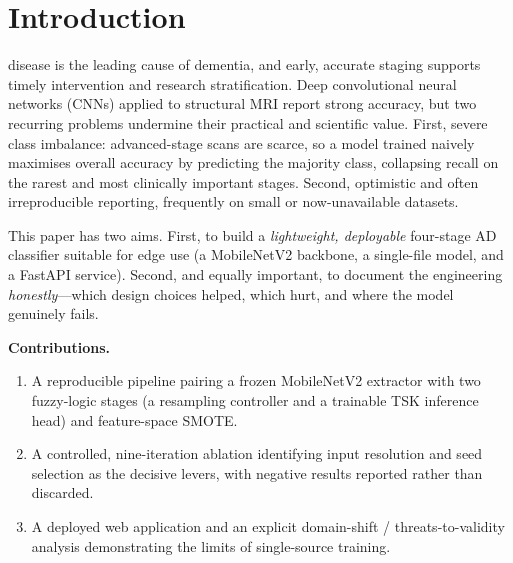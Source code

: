 \documentclass[journal]{IEEEtran}
\begin{document}
\section{Introduction}
 disease is the leading cause of dementia, and early,
accurate staging supports timely intervention and research stratification. Deep
convolutional neural networks (CNNs) applied to structural MRI report strong
accuracy, but two recurring problems undermine their practical and scientific
value. First, severe class imbalance: advanced-stage scans are scarce, so a model
trained naively maximises overall accuracy by predicting the majority class,
collapsing recall on the rarest and most clinically important stages. Second,
optimistic and often irreproducible reporting, frequently on small or
now-unavailable datasets.

This paper has two aims. First, to build a \emph{lightweight, deployable}
four-stage AD classifier suitable for edge use (a MobileNetV2 backbone, a
single-file model, and a FastAPI service). Second, and equally important, to
document the engineering \emph{honestly}---which design choices helped, which
hurt, and where the model genuinely fails.

\noindent\textbf{Contributions.}
\begin{enumerate}
  \item A reproducible pipeline pairing a frozen MobileNetV2 extractor with two
  fuzzy-logic stages (a resampling controller and a trainable TSK inference head)
  and feature-space SMOTE.
  \item A controlled, nine-iteration ablation identifying input resolution and
  seed selection as the decisive levers, with negative results reported rather
  than discarded.
  \item A deployed web application and an explicit domain-shift /
  threats-to-validity analysis demonstrating the limits of single-source
  training.
\end{enumerate}
\end{document}
